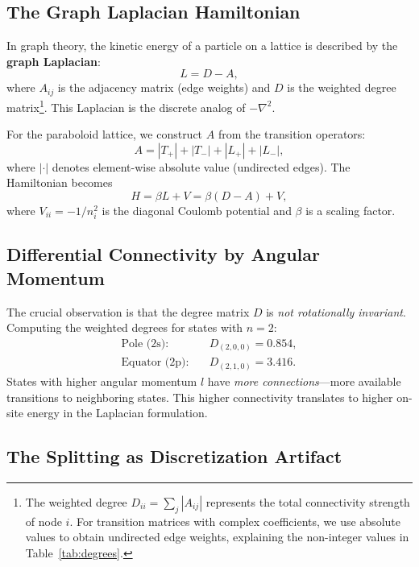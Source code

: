 \documentclass[aps,pra,twocolumn,superscriptaddress,longbibliography]{revtex4-2}
\begin{document}
\subsection{The Graph Laplacian Hamiltonian}

In graph theory, the kinetic energy of a particle on a lattice is described by the \textbf{graph Laplacian}:
\begin{equation}
L = D - A,
\label{eq:laplacian}
\end{equation}
where $A_{ij}$ is the adjacency matrix (edge weights) and $D$ is the weighted degree matrix\footnote{The weighted degree $D_{ii} = \sum_j |A_{ij}|$ represents the total connectivity strength of node $i$. For transition matrices with complex coefficients, we use absolute values to obtain undirected edge weights, explaining the non-integer values in Table~\ref{tab:degrees}.}. This Laplacian is the discrete analog of $-\nabla^2$.

For the paraboloid lattice, we construct $A$ from the transition operators:
\begin{equation}
A = |T_+| + |T_-| + |L_+| + |L_-|,
\end{equation}
where $|\cdot|$ denotes element-wise absolute value (undirected edges). The Hamiltonian becomes
\begin{equation}
H = \beta L + V = \beta (D - A) + V,
\label{eq:ham_graph}
\end{equation}
where $V_{ii} = -1/n_i^2$ is the diagonal Coulomb potential and $\beta$ is a scaling factor.

\subsection{Differential Connectivity by Angular Momentum}

The crucial observation is that the degree matrix $D$ is \textit{not rotationally invariant}. Computing the weighted degrees for states with $n=2$:
\begin{align}
\text{Pole (2s):} \quad & D_{(2,0,0)} = 0.854, \\
\text{Equator (2p):} \quad & D_{(2,1,0)} = 3.416.
\end{align}
States with higher angular momentum $l$ have \textit{more connections}---more available transitions to neighboring states. This higher connectivity translates to higher on-site energy in the Laplacian formulation.

\subsection{The Splitting as Discretization Artifact}
\end{document}
